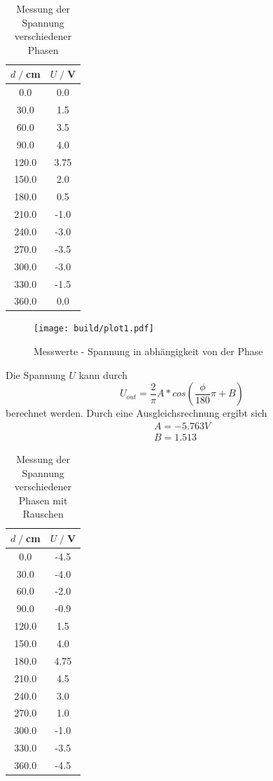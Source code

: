 \begin{table}
    \centering
    \begin{tabular}{c c}
        \toprule
        $d\;/\;$cm & $U\;/\;$V\\
        \midrule
        0.0 & 0.0 \\ 
        30.0 & 1.5 \\ 
        60.0 & 3.5 \\ 
        90.0 & 4.0 \\ 
        120.0 & 3.75 \\ 
        150.0 & 2.0 \\ 
        180.0 & 0.5 \\ 
        210.0 & -1.0 \\ 
        240.0 & -3.0 \\ 
        270.0 & -3.5 \\ 
        300.0 & -3.0 \\ 
        330.0 & -1.5 \\ 
        360.0 & 0.0 \\ 
        \bottomrule
    \end{tabular}
    \caption{Messung der Spannung verschiedener Phasen}
    \label{tab:V1_Werte}
\end{table}
\begin{figure}[H]
    \centering
    \texttt{[image: build/plot1.pdf]}
    \caption{Messwerte - Spannung in abhängigkeit von der Phase}        
    \label{fig:plot1}
\end{figure}

Die Spannung $U$ kann durch 
\begin{equation*}
    U_{out} = \frac{2}{\pi} A*cos(\frac{\phi}{180}\pi+B)
\end{equation*}
berechnet werden.
Durch eine Ausgleichsrechnung ergibt sich
\begin{align*}
    A=  -5.763 V\\
    B=  1.513
\end{align*}
\begin{table}
    \centering
    \begin{tabular}{c c}
        \toprule
        $d\;/\;$cm & $U\;/\;$V\\
        \midrule
        0.0 & -4.5 \\
        30.0 & -4.0 \\
        60.0 & -2.0 \\
        90.0 & -0.9 \\
        120.0 & 1.5 \\
        150.0 & 4.0 \\
        180.0 & 4.75 \\
        210.0 & 4.5 \\
        240.0 & 3.0 \\
        270.0 & 1.0 \\
        300.0 & -1.0 \\
        330.0 & -3.5 \\
        360.0 & -4.5 \\
        \bottomrule
    \end{tabular}
    \caption{Messung der Spannung verschiedener Phasen mit Rauschen}
    \label{tab:V2_Werte}
\end{table}

